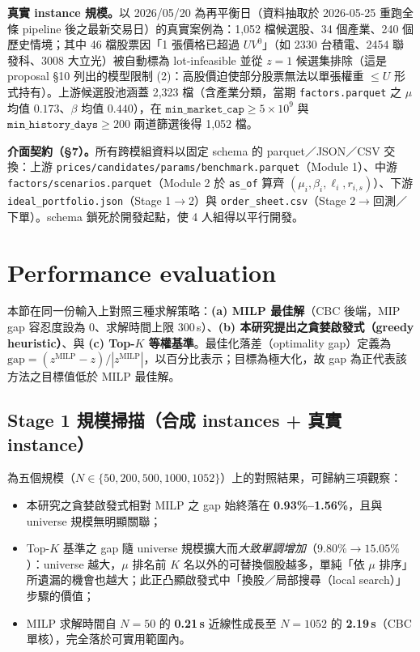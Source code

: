 \documentclass[11pt,a4paper]{article}
\newenvironment{itemizeTight}{\begin{itemize}\vspace{-8pt}}{\end{itemize}\vspace{-8pt}}
\begin{document}
\textbf{真實 instance 規模。}{}以 2026/05/20 為再平衡日（資料抽取於 2026-05-25 重跑全條 pipeline 後之最新交易日）的真實案例為：1{,}052 檔候選股、34 個產業、240 個歷史情境；其中 46 檔股票因「1 張價格已超過 $U V^0$」（如 2330 台積電、2454 聯發科、3008 大立光）被自動標為 lot-infeasible 並從 $z = 1$ 候選集排除（這是 proposal §10 列出的模型限制 (2)：高股價迫使部分股票無法以單張權重 $\leq U$ 形式持有）。上游候選股池涵蓋 2{,}323 檔（含產業分類，當期 \texttt{factors.parquet} 之 $\mu$ 均值 $0.173$、$\beta$ 均值 $0.440$），在 $\texttt{min\_market\_cap} \geq 5 \times 10^9$ 與 $\texttt{min\_history\_days} \geq 200$ 兩道篩選後得 1{,}052 檔。

\textbf{介面契約（§7）。}{}所有跨模組資料以固定 schema 的 parquet／JSON／CSV 交換：上游 \texttt{prices/candidates/params/benchmark.parquet}（Module 1）、中游 \texttt{factors/scenarios.parquet}（Module 2 於 \texttt{as\_of} 算齊 $(\mu_i,\beta_i,\ell_i,r_{i,s})$）、下游 \texttt{ideal\_portfolio.json}（Stage 1$\to$2）與 \texttt{order\_sheet.csv}（Stage 2$\to$回測／下單）。schema 鎖死於開發起點，使 4 人組得以平行開發。



\section{Performance evaluation}
\label{sec-eval}

本節在同一份輸入上對照三種求解策略：\textbf{(a) MILP 最佳解}（CBC 後端，MIP gap 容忍度設為 $0$、求解時間上限 $300$\,s）、\textbf{(b) 本研究提出之貪婪啟發式（greedy heuristic）}、與 \textbf{(c) Top-$K$ 等權基準}。最佳化落差（optimality gap）定義為 $\text{gap} = (z^{\text{MILP}} - z) / |z^{\text{MILP}}|$，以百分比表示；目標為極大化，故 gap 為正代表該方法之目標值低於 MILP 最佳解。

\subsection{Stage 1 規模掃描（合成 instances + 真實 instance）}

 為五個規模（$N \in \{50, 200, 500, 1000, 1052\}$）上的對照結果，可歸納三項觀察：
\begin{itemizeTight}
    \item 本研究之貪婪啟發式相對 MILP 之 gap 始終落在 \textbf{0.93\%--1.56\%}，且與 universe 規模無明顯關聯；
    \item Top-$K$ 基準之 gap 隨 universe 規模擴大而\emph{大致單調增加}（$9.80\% \to 15.05\%$）：universe 越大，$\mu$ 排名前 $K$ 名以外的可替換個股越多，單純「依 $\mu$ 排序」所遺漏的機會也越大；此正凸顯啟發式中「換股／局部搜尋（local search）」步驟的價值；
    \item MILP 求解時間自 $N=50$ 的 \textbf{0.21\,s} 近線性成長至 $N=1052$ 的 \textbf{2.19\,s}（CBC 單核），完全落於可實用範圍內。
\end{itemizeTight}
\end{document}
